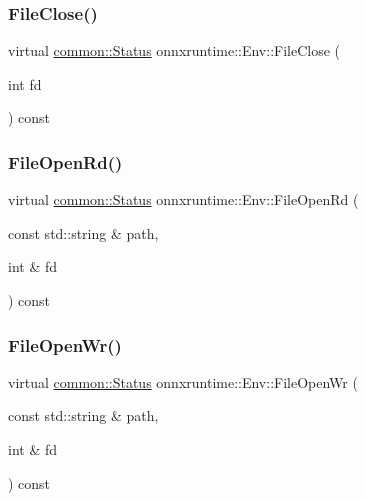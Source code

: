 \mbox{\label{classonnxruntime_1_1Env_aba47acf27bb87a6e5710e45b20e0fc4c}} 
\subsubsection{\texorpdfstring{File\+Close()}{FileClose()}}
{\footnotesize\ttfamily virtual \mbox{\hyperlink{classonnxruntime_1_1common_1_1Status}{common\+::\+Status}} onnxruntime\+::\+Env\+::\+File\+Close (\begin{DoxyParamCaption}\item[{int}]{fd }\end{DoxyParamCaption}) const\hspace{0.3cm}{\ttfamily [pure virtual]}}

\mbox{\label{classonnxruntime_1_1Env_aa0c0ce6e07920d1acd1794cff15d0577}} 
\subsubsection{\texorpdfstring{File\+Open\+Rd()}{FileOpenRd()}}
{\footnotesize\ttfamily virtual \mbox{\hyperlink{classonnxruntime_1_1common_1_1Status}{common\+::\+Status}} onnxruntime\+::\+Env\+::\+File\+Open\+Rd (\begin{DoxyParamCaption}\item[{const std\+::string \&}]{path,  }\item[{int \&}]{fd }\end{DoxyParamCaption}) const\hspace{0.3cm}{\ttfamily [pure virtual]}}

\mbox{\label{classonnxruntime_1_1Env_a3a4b5c4983f2fe3f8fad18dcc8c44f1f}} 
\subsubsection{\texorpdfstring{File\+Open\+Wr()}{FileOpenWr()}}
{\footnotesize\ttfamily virtual \mbox{\hyperlink{classonnxruntime_1_1common_1_1Status}{common\+::\+Status}} onnxruntime\+::\+Env\+::\+File\+Open\+Wr (\begin{DoxyParamCaption}\item[{const std\+::string \&}]{path,  }\item[{int \&}]{fd }\end{DoxyParamCaption}) const\hspace{0.3cm}{\ttfamily [pure virtual]}}

